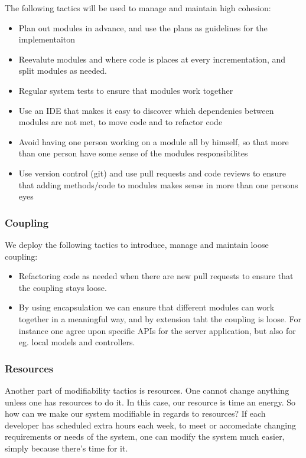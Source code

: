 The following tactics will be used to manage and maintain high cohesion:
\begin{itemize}
    \item Plan out modules in advance, and use the plans as guidelines for the implementaiton
    \item Reevalute modules and where code is places at every incrementation, and split modules as needed.
    \item Regular system tests to ensure that modules work together
    \item Use an IDE that makes it easy to discover which dependenies between modules are not met, to move code and to refactor code
    \item Avoid having one person working on a module all by himself, so that more than one person have some sense of the modules responsibilites
    \item Use version control (git) and use pull requests and code reviews to ensure that adding methods/code to modules makes sense in more than one persons eyes
\end{itemize}

\subsubsection{Coupling}
We deploy the following tactics to introduce, manage and maintain loose coupling:

\begin{itemize}
\item Refactoring code as needed when there are new pull requests to ensure that the coupling stays loose.
\item By using encapsulation we can ensure that different modules can work together in a meaningful way, and by extension taht the coupling is loose. For instance one agree upon specific APIs for the server application, but also for eg. local models and controllers. \cite{progark, 123}
\end{itemize}

\subsubsection{Resources}
Another part of modifiability tactics is resources. One cannot change anything unless one has resources to do it. In this case, our resource is time an energy. So how can we make our system modifiable in regards to resources? If each developer has scheduled extra hours each week, to meet or accomedate changing requirements or needs of the system, one can modify the system much easier, simply because there's time for it.

